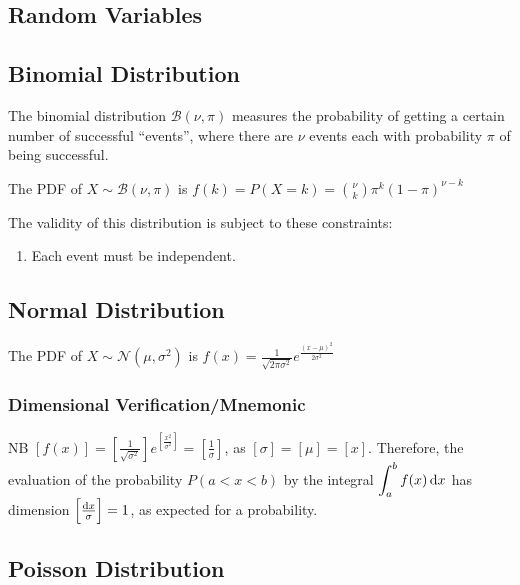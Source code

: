 \documentclass[a4paper,11pt]{article}
\begin{document}
    \subsection{Random Variables}

    \subsection{Binomial Distribution}


    The binomial distribution $\mathcal B(\nu, \pi)$ measures the probability of
    getting a certain number of successful ``events'', where there are $\nu$
    events each with probability $\pi$ of being successful.

    The PDF of $X \sim \mathcal B(\nu, \pi)$ is
    $\displaystyle f(k) = P(X = k) = {\nu \choose k} \pi^k (1 - \pi)^{\nu - k}$

    The validity of this distribution is subject to these constraints:
    \begin{enumerate}
    \item Each event must be independent.
    \end{enumerate}

    \subsection{Normal Distribution}


    The PDF of $X \sim \mathcal N(\mu, \sigma^2)$ is
    $\displaystyle f(x) = \frac{1}{\sqrt{2\pi\sigma^2}}
                            e^{\frac{(x - \mu)^2}{2\sigma^2}}$

    \subsubsection{Dimensional Verification/Mnemonic}

    NB $\displaystyle\left[f(x)\right] =
        \left[\frac 1{\sqrt{\sigma^2}}\right]
        e^{\left[\frac{x^2}{\sigma^2}\right]}
      = \left[\frac 1\sigma\right]$, as
    $\left[\sigma\right] = \left[\mu\right] = \left[x\right]$. Therefore, the
    evaluation of the probability $P(a < x < b)$ by the integral
    $\displaystyle\int_a^bf(x)\dif x$ has dimension
    $\left[\frac{\dif x}{\sigma}\right] = 1$, as expected for a probability.

    \subsection{Poisson Distribution}
\end{document}

